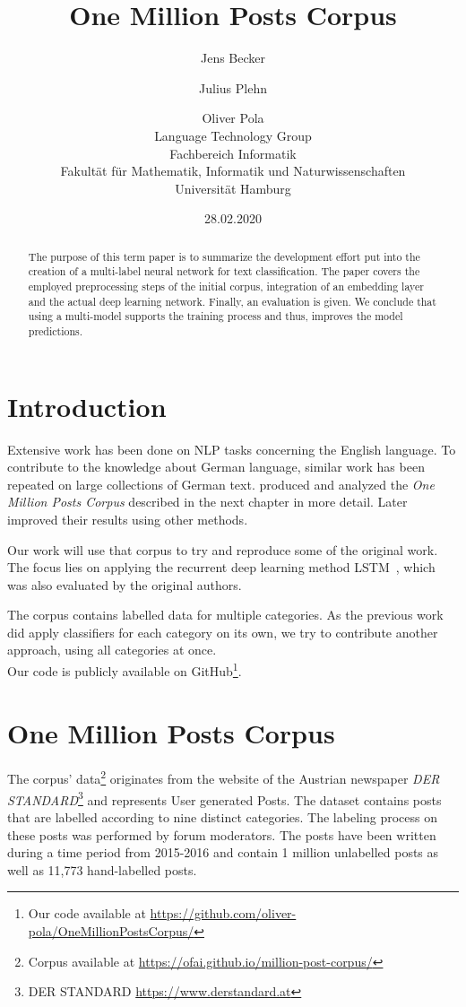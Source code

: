 \documentclass[11pt,a4paper]{article}
\title{One Million Posts Corpus}
\author{Jens Becker \and Julius Plehn \and Oliver Pola \\ 
	Language Technology Group \\
	Fachbereich Informatik \\
	Fakultät für Mathematik, Informatik und Naturwissenschaften \\
	Universität Hamburg
}
\date{28.02.2020}
\begin{document}
\maketitle
\begin{abstract}
The purpose of this term paper is to summarize the development effort put into the creation of a multi-label neural network for text classification. The paper covers the employed preprocessing steps of the initial corpus, integration of an embedding layer and the actual deep learning network.
Finally, an evaluation is given. We conclude that using a multi-model supports the training process and thus, improves the model predictions.

 
\end{abstract}

\section{Introduction}

Extensive work has been done on NLP tasks concerning the English language.
To contribute to the knowledge about German language, similar work has been repeated on large collections of German text.
 produced and analyzed the \textit{One Million Posts Corpus} described in the next chapter in more detail. Later  improved their results using other methods.

Our work will use that corpus to try and reproduce some of the original work.
The focus lies on applying the recurrent deep learning method LSTM~\cite{lstm}, which was also evaluated by the original authors.

The corpus contains labelled data for multiple categories.
As the previous work did apply classifiers for each category on its own, we try to contribute another approach, using all categories at once.\\

Our code is publicly available on GitHub\footnote{Our code available at \url{https://github.com/oliver-pola/OneMillionPostsCorpus/}}.

\section{One Million Posts Corpus}
The corpus' data\footnote{Corpus available at \url{https://ofai.github.io/million-post-corpus/}} originates from the website of the Austrian newspaper \textit{DER STANDARD}\footnote{DER STANDARD \url{https://www.derstandard.at}} and represents User generated Posts. The dataset contains posts that are labelled according to nine distinct categories. The labeling process on these posts was performed by forum moderators. The posts have been written during a time period from 2015-2016 and contain 1 million unlabelled posts as well as 11,773 hand-labelled posts.
\end{document}
